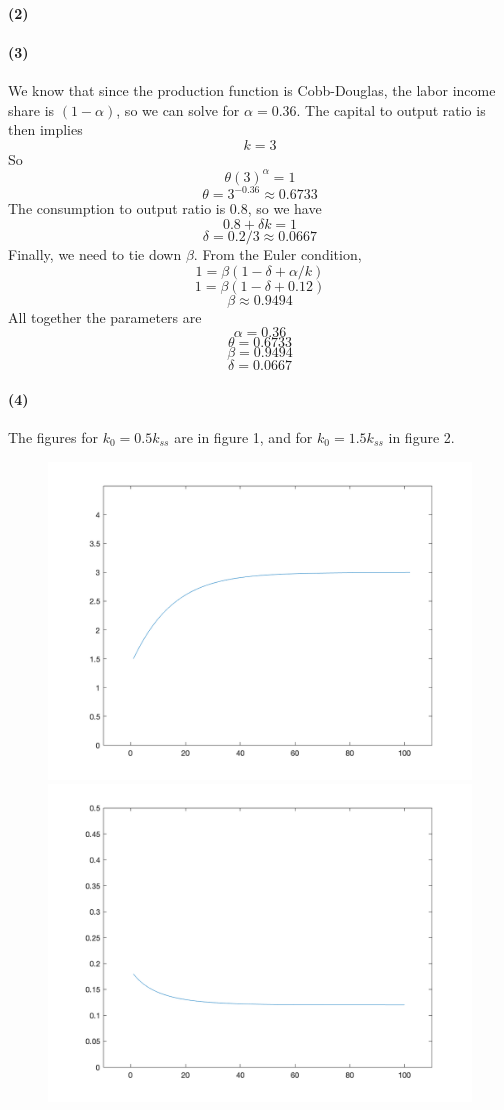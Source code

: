 \documentclass[10pt,letter]{article}
\newcommand{\problempart}[1]{\paragraph{#1}}
\begin{document}
\problempart{(2)}
\problempart{(3)}
We know that since the production function is Cobb-Douglas, the labor income share is $(1-\alpha)$, so we can solve for $\alpha = 0.36$. The capital to output ratio is then implies
\[ k = 3 \]
So
\[ \theta (3)^\alpha = 1 \]
\[ \theta = 3^{-0.36} \approx 0.6733 \]
The consumption to output ratio is 0.8, so we have
\[ 0.8 + \delta k = 1 \]
\[ \delta = 0.2 / 3 \approx 0.0667\]
Finally, we need to tie down $\beta$. From the Euler condition,
\[ 1 = \beta (1 - \delta + \alpha/k) \]
\[ 1 = \beta (1 - \delta + 0.12) \]
\[ \beta \approx 0.9494 \]
All together the parameters are
\[ \alpha = 0.36 \]
\[ \theta = 0.6733 \]
\[ \beta = 0.9494 \]
\[ \delta = 0.0667\]
\problempart{(4)} The figures for $k_0 = 0.5k_{ss}$ are in figure 1, and for $k_0 = 1.5k_{ss}$ in figure 2.
\begin{figure}
\includegraphics[scale=0.2]{ps2q3_4k1}
\includegraphics[scale=0.2]{ps2q3_4r_k1}

\end{figure}
\end{document}
